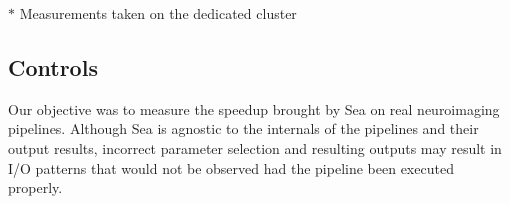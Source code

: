 \documentclass[pdflatex,sn-mathphys-num]{sn-jnl}
\theoremstyle{thmstyleone}%
\theoremstyle{thmstyletwo}%
\theoremstyle{thmstylethree}%
\begin{document}
    

    
    \begin{table}[t]
      \centering
    \footnotesize{$*$ Measurements taken on the dedicated cluster}
    \caption{Pipeline execution characteristics based on the processing of a single fMRI image using a single application process}
    \label{table:seaneuro-pipelines}
  \end{table}


    \subsection{Controls}
    Our objective was to measure the speedup brought by Sea on real neuroimaging
    pipelines. Although Sea is agnostic to the internals of the pipelines and
    their output results, incorrect parameter selection and resulting outputs
    may result in I/O patterns that would not be observed had the pipeline been
    executed properly.
   
\end{document}
